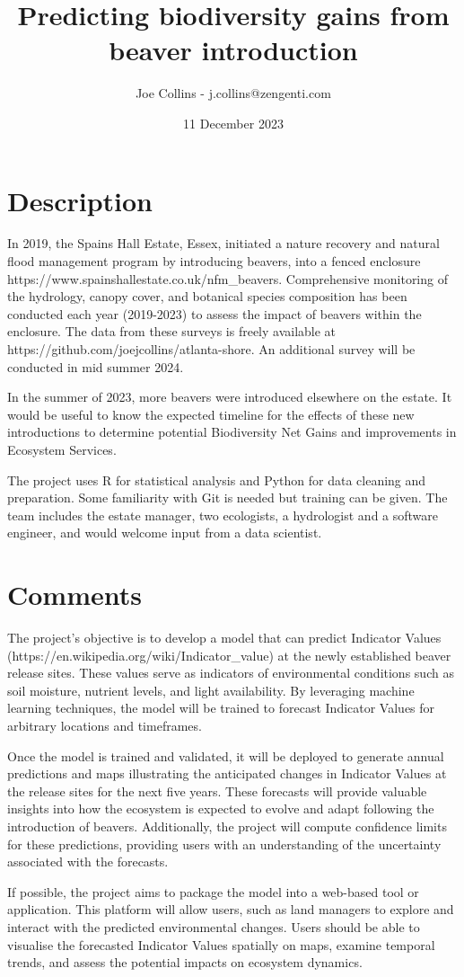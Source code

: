\documentclass{roles}
\title{Predicting biodiversity gains from beaver introduction}
\author{Joe Collins - j.collins@zengenti.com}
\date{11 December 2023}
\begin{document}
\maketitle

\section*{Description}

In 2019, the Spains Hall Estate, Essex, initiated a nature recovery and natural flood management program by introducing beavers, into a fenced enclosure https://www.spainshallestate.co.uk/nfm\_beavers.  Comprehensive monitoring of the hydrology, canopy cover, and botanical species composition has been conducted each year (2019-2023) to assess the impact of beavers within the enclosure.  The data from these surveys is freely available at https://github.com/joejcollins/atlanta-shore.  An additional survey will be conducted in mid summer 2024.

In the summer of 2023, more beavers were introduced elsewhere on the estate.  It would be useful to know the expected timeline for the effects of these new introductions to determine potential Biodiversity Net Gains and improvements in Ecosystem Services. 

The project uses R for statistical analysis and Python for data cleaning and preparation. Some familiarity with Git is needed but training can be given. The team includes the estate manager, two ecologists, a hydrologist and a software engineer, and would welcome input from a data scientist.

\section*{Comments}

The project's objective is to develop a model that can predict Indicator Values (https://en.wikipedia.org/wiki/Indicator_value) at the newly established beaver release sites. These values serve as indicators of environmental conditions such as soil moisture, nutrient levels, and light availability. By leveraging machine learning techniques, the model will be trained to forecast Indicator Values for arbitrary locations and timeframes.

Once the model is trained and validated, it will be deployed to generate annual predictions and maps illustrating the anticipated changes in Indicator Values at the release sites for the next five years. These forecasts will provide valuable insights into how the ecosystem is expected to evolve and adapt following the introduction of beavers. Additionally, the project will compute confidence limits for these predictions, providing users with an understanding of the uncertainty associated with the forecasts.

If possible, the project aims to package the model into a web-based tool or application. This platform will allow users, such as land managers to explore and interact with the predicted environmental changes. Users should be able to visualise the forecasted Indicator Values spatially on maps, examine temporal trends, and assess the potential impacts on ecosystem dynamics.
\end{document}

